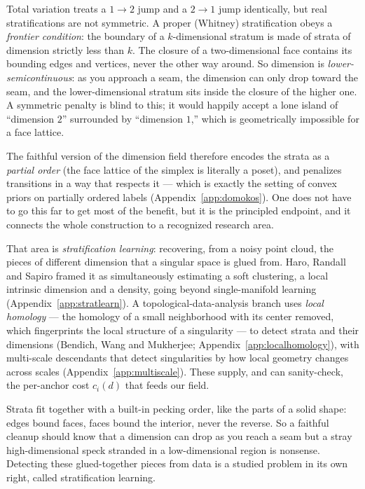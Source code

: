 \documentclass[11pt]{article}
\theoremstyle{definition}
\theoremstyle{remark}
\begin{document}
Total variation treats a $1\!\to\!2$ jump and a $2\!\to\!1$ jump identically, but
real stratifications are not symmetric. A proper (Whitney) stratification obeys a
\emph{frontier condition}: the boundary of a $k$-dimensional stratum is made of
strata of dimension strictly less than $k$. The closure of a two-dimensional face
contains its bounding edges and vertices, never the other way around. So dimension
is \emph{lower-semicontinuous}: as you approach a seam, the dimension can only drop
toward the seam, and the lower-dimensional stratum sits inside the closure of the
higher one. A symmetric penalty is blind to this; it would happily accept a lone
island of ``dimension $2$'' surrounded by ``dimension $1$,'' which is
geometrically impossible for a face lattice.

The faithful version of the dimension field therefore encodes the strata as a
\emph{partial order} (the face lattice of the simplex is literally a poset), and
penalizes transitions in a way that respects it --- which is exactly the setting
of convex priors on partially ordered labels (Appendix~\ref{app:domokos}). One
does not have to go this far to get most of the benefit, but it is the principled
endpoint, and it connects the whole construction to a recognized research area.

That area is \emph{stratification learning}: recovering, from a noisy point cloud,
the pieces of different dimension that a singular space is glued from. Haro,
Randall and Sapiro framed it as simultaneously estimating a soft clustering, a
local intrinsic dimension and a density, going beyond single-manifold learning
(Appendix~\ref{app:stratlearn}). A topological-data-analysis branch uses
\emph{local homology} --- the homology of a small neighborhood with its center
removed, which fingerprints the local structure of a singularity --- to detect
strata and their dimensions (Bendich, Wang and Mukherjee; Appendix~\ref{app:localhomology}),
with multi-scale descendants that detect singularities by how local geometry
changes across scales (Appendix~\ref{app:multiscale}). These supply, and can
sanity-check, the per-anchor cost $c_i(d)$ that feeds our field.

\begin{plain}
Strata fit together with a built-in pecking order, like the parts of a solid
shape: edges bound faces, faces bound the interior, never the reverse. So a
faithful cleanup should know that a dimension can drop as you reach a seam but a
stray high-dimensional speck stranded in a low-dimensional region is nonsense.
Detecting these glued-together pieces from data is a studied problem in its own
right, called stratification learning.
\end{plain}
\end{document}
